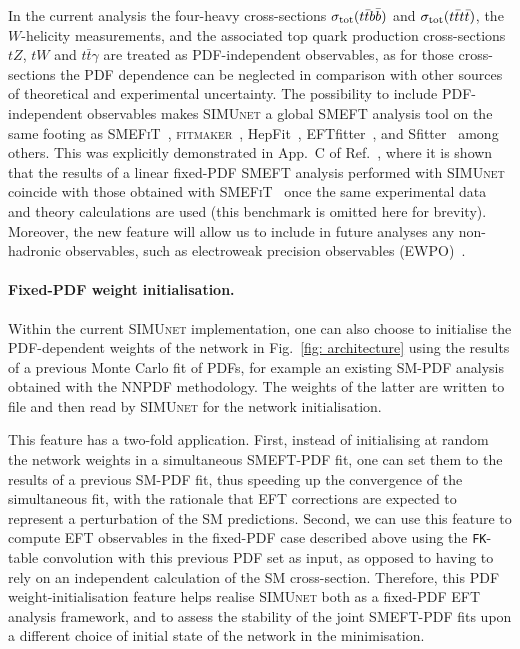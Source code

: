 \documentclass[withindex,glossary]{cam-thesis}
\newcommand{\simunet}{\textsc{SIMUnet}}
\newcommand{\fitm}{\textsc{fitmaker}}
\newcommand{\smefit}{\textsc{SMEFiT}}
\begin{document}
In the current analysis the four-heavy cross-sections $\sigma_{\rm tot}(t\bar{t}b\bar{b})$
and $\sigma_{\rm tot}(t\bar{t}t\bar{t})$, the $W$-helicity measurements,
and the associated top quark production cross-sections $tZ$, $tW$ and
$t\bar{t}\gamma$ are treated as PDF-independent observables, as
 for those cross-sections the PDF dependence can be neglected
in comparison with other sources of theoretical and experimental
uncertainty. 
%
%
%
The possibility to include PDF-independent observables makes \simunet{} a global SMEFT analysis tool 
on the same footing as \smefit~\cite{Hartland:2019bjb,Giani:2023gfq}, \fitm~\cite{Ellis:2020unq},
{\sc\small HepFit}~\cite{DeBlas:2019ehy}, {\sc\small EFTfitter}~\cite{Castro:2016jjv},
and {\sc\small Sfitter}~\cite{Brivio:2019ius} among others. This was explicitly demonstrated
in App.~C of Ref.~\cite{Kassabov:2023hbm}, where it is shown that the
results of a linear fixed-PDF SMEFT analysis
performed with \simunet{} coincide with those obtained with
\smefit~\cite{Giani:2023gfq} once the same
experimental data and theory calculations are used (this benchmark is omitted here for brevity).
%
Moreover, the new feature will allow us to include in future analyses any non-hadronic
observables, such as electroweak precision observables (EWPO)~\cite{Han:2004az}. 
%


\paragraph{Fixed-PDF weight initialisation.}
%
Within the current  \simunet{} implementation, one can also choose to initialise
the PDF-dependent weights of the network in Fig.~\ref{fig: architecture}
using the results of a previous Monte Carlo fit of PDFs, for example
an existing SM-PDF analysis obtained with the NNPDF methodology.
%
The weights of the latter are written to file and then read by  \simunet{} for the network
initialisation.

This feature has a two-fold application.
%
First, instead of initialising at random the network weights in a
simultaneous SMEFT-PDF fit,
one can set them to the results of a previous SM-PDF fit, thus
speeding up the convergence of the simultaneous fit, with the rationale that
EFT corrections are expected to represent a perturbation of the SM predictions.
%
Second, we can use this feature to compute EFT observables in the fixed-PDF case
described above using the {\tt FK}-table convolution with this previous PDF set as input,
as opposed to having to rely on an independent calculation of the SM cross-section.
%
Therefore, this PDF weight-initialisation feature helps realise
\simunet{} both as a fixed-PDF EFT analysis framework, and to assess the stability of the
joint SMEFT-PDF fits upon a different choice of initial state of the network
in the minimisation.
\end{document}

